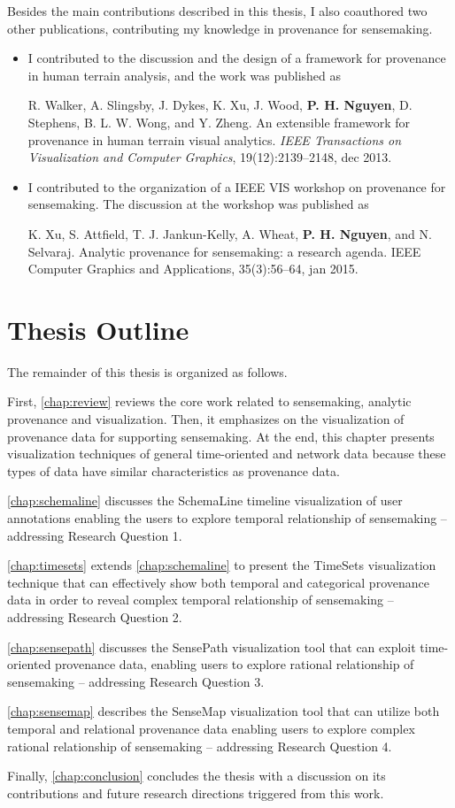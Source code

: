 Besides the main contributions described in this thesis, I also coauthored two other publications, contributing my knowledge in provenance for sensemaking.

\begin{itemize}
	\item I contributed to the discussion and the design of a framework for provenance in human terrain analysis, and the work was published as
	
	\qquad R. Walker, A. Slingsby, J. Dykes, K. Xu, J. Wood, \textbf{P. H. Nguyen}, D. Stephens, B. L. W. Wong, and Y. Zheng. An extensible framework for provenance in human terrain visual analytics. \textit{IEEE Transactions on Visualization and Computer Graphics}, 19(12):2139--2148, dec 2013.
	
	\item I contributed to the organization of a IEEE VIS workshop on provenance for sensemaking. The discussion at the workshop was published as
	
	\qquad K. Xu, S. Attfield, T. J. Jankun-Kelly, A. Wheat, \textbf{P. H. Nguyen}, and N. Selvaraj. Analytic provenance for sensemaking: a research agenda. IEEE Computer Graphics and Applications, 35(3):56--64, jan 2015.	
\end{itemize}

\section{Thesis Outline} 
The remainder of this thesis is organized as follows.

First, \autoref{chap:review} reviews the core work related to sensemaking, analytic provenance and visualization. Then, it emphasizes on the visualization of provenance data for supporting sensemaking. At the end, this chapter presents visualization techniques of general time-oriented and network data because these types of data have similar characteristics as provenance data.

\autoref{chap:schemaline} discusses the SchemaLine timeline visualization of user annotations enabling the users to explore temporal relationship of sensemaking -- addressing Research Question 1.

\autoref{chap:timesets} extends \autoref{chap:schemaline} to present the TimeSets visualization technique that can effectively show both temporal and categorical provenance data in order to reveal complex temporal relationship of sensemaking -- addressing Research Question 2.

\autoref{chap:sensepath} discusses the SensePath visualization tool that can exploit time-oriented provenance data, enabling users to explore rational relationship of sensemaking -- addressing Research Question 3.

\autoref{chap:sensemap} describes the SenseMap visualization tool that can utilize both temporal and relational provenance data enabling users to explore complex rational relationship of sensemaking -- addressing Research Question 4.

Finally, \autoref{chap:conclusion} concludes the thesis with a discussion on its contributions and future research directions triggered from this work.